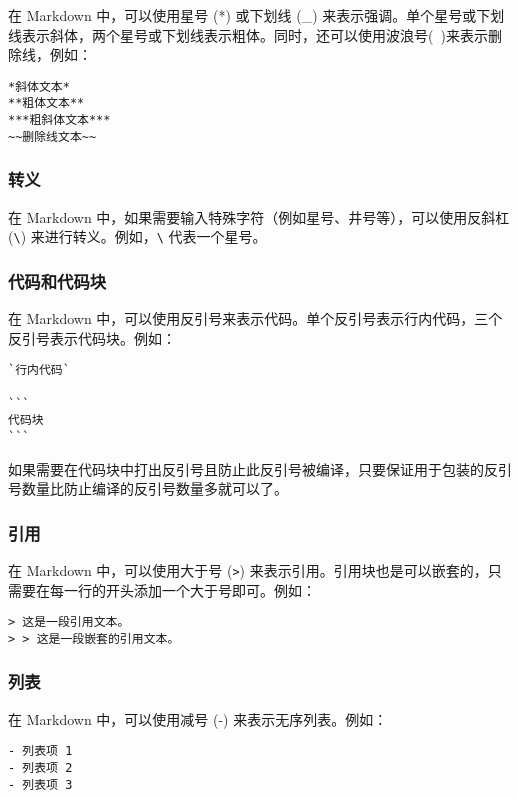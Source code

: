 \documentclass[../main.tex]{subfiles}
\begin{document}
在 Markdown 中，可以使用星号 (*) 或下划线 (\_) 来表示强调。单个星号或下划线表示斜体，两个星号或下划线表示粗体。同时，还可以使用波浪号(~)来表示删除线，例如：

\begin{lstlisting}
*斜体文本*
**粗体文本**
***粗斜体文本***
~~删除线文本~~
\end{lstlisting}

\subsubsection{转义}

在 Markdown 中，如果需要输入特殊字符（例如星号、井号等），可以使用反斜杠 (\texttt{\textbackslash}) 来进行转义。例如，\texttt{\textbackslash*} 代表一个星号。

\subsubsection{代码和代码块}

在 Markdown 中，可以使用反引号来表示代码。单个反引号表示行内代码，三个反引号表示代码块。例如：

\begin{lstlisting}
`行内代码`

```
代码块
```
\end{lstlisting}

如果需要在代码块中打出反引号且防止此反引号被编译，只要保证用于包装的反引号数量比防止编译的反引号数量多就可以了。

\subsubsection{引用}

在 Markdown 中，可以使用大于号 (\texttt{>}) 来表示引用。引用块也是可以嵌套的，只需要在每一行的开头添加一个大于号即可。例如：

\begin{lstlisting}
> 这是一段引用文本。
> > 这是一段嵌套的引用文本。
\end{lstlisting}

\subsubsection{列表}

在 Markdown 中，可以使用减号 (-) 来表示无序列表。例如：

\begin{lstlisting}
- 列表项 1
- 列表项 2
- 列表项 3
\end{lstlisting}
\end{document}

